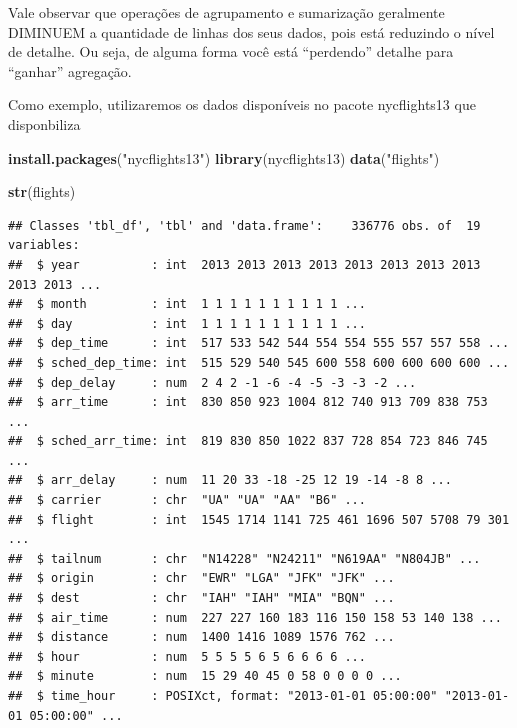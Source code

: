 \documentclass[]{book}
\newenvironment{Shaded}{\begin{snugshade}}{\end{snugshade}}
\newcommand{\KeywordTok}[1]{\textcolor[rgb]{0.13,0.29,0.53}{\textbf{#1}}}
\newcommand{\StringTok}[1]{\textcolor[rgb]{0.31,0.60,0.02}{#1}}
\newcommand{\NormalTok}[1]{#1}
\begin{document}
Vale observar que operações de agrupamento e sumarização geralmente
DIMINUEM a quantidade de linhas dos seus dados, pois está reduzindo o
nível de detalhe. Ou seja, de alguma forma você está ``perdendo''
detalhe para ``ganhar'' agregação.

Como exemplo, utilizaremos os dados disponíveis no pacote nycflights13
que disponbiliza

\begin{Shaded}
\begin{Highlighting}[]
\KeywordTok{install.packages}\NormalTok{(}\StringTok{"nycflights13"}\NormalTok{)}
\KeywordTok{library}\NormalTok{(nycflights13)}
\KeywordTok{data}\NormalTok{(}\StringTok{"flights"}\NormalTok{)}
\end{Highlighting}
\end{Shaded}

\begin{Shaded}
\begin{Highlighting}[]
\KeywordTok{str}\NormalTok{(flights)}
\end{Highlighting}
\end{Shaded}

\begin{verbatim}
## Classes 'tbl_df', 'tbl' and 'data.frame':    336776 obs. of  19 variables:
##  $ year          : int  2013 2013 2013 2013 2013 2013 2013 2013 2013 2013 ...
##  $ month         : int  1 1 1 1 1 1 1 1 1 1 ...
##  $ day           : int  1 1 1 1 1 1 1 1 1 1 ...
##  $ dep_time      : int  517 533 542 544 554 554 555 557 557 558 ...
##  $ sched_dep_time: int  515 529 540 545 600 558 600 600 600 600 ...
##  $ dep_delay     : num  2 4 2 -1 -6 -4 -5 -3 -3 -2 ...
##  $ arr_time      : int  830 850 923 1004 812 740 913 709 838 753 ...
##  $ sched_arr_time: int  819 830 850 1022 837 728 854 723 846 745 ...
##  $ arr_delay     : num  11 20 33 -18 -25 12 19 -14 -8 8 ...
##  $ carrier       : chr  "UA" "UA" "AA" "B6" ...
##  $ flight        : int  1545 1714 1141 725 461 1696 507 5708 79 301 ...
##  $ tailnum       : chr  "N14228" "N24211" "N619AA" "N804JB" ...
##  $ origin        : chr  "EWR" "LGA" "JFK" "JFK" ...
##  $ dest          : chr  "IAH" "IAH" "MIA" "BQN" ...
##  $ air_time      : num  227 227 160 183 116 150 158 53 140 138 ...
##  $ distance      : num  1400 1416 1089 1576 762 ...
##  $ hour          : num  5 5 5 5 6 5 6 6 6 6 ...
##  $ minute        : num  15 29 40 45 0 58 0 0 0 0 ...
##  $ time_hour     : POSIXct, format: "2013-01-01 05:00:00" "2013-01-01 05:00:00" ...
\end{verbatim}
\end{document}
